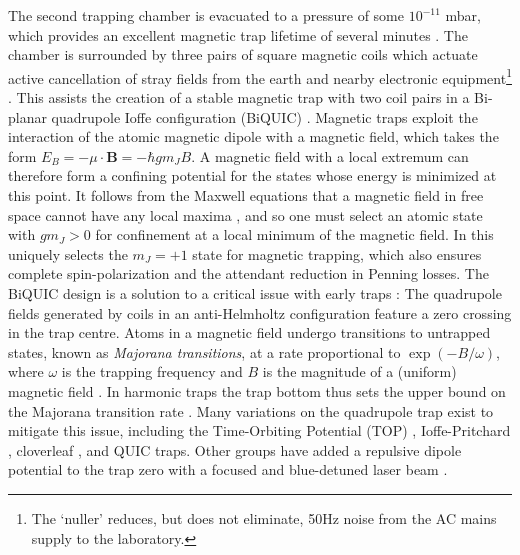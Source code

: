 	The second trapping chamber is evacuated to a pressure of some $10^{-11}$ mbar, which provides an excellent magnetic trap lifetime of several minutes . The chamber is surrounded by three pairs of square magnetic coils which actuate active cancellation of stray fields from the earth and nearby electronic equipment\footnote{The `nuller' reduces, but does not eliminate, 50Hz noise from the AC mains supply to the laboratory. } \cite{dedman07}. This assists the creation of a stable magnetic trap with two coil pairs in a Bi-planar quadrupole Ioffe configuration (BiQUIC) \cite{dall07}. Magnetic traps exploit the interaction of the atomic magnetic dipole with a magnetic field, which takes the form $E_B = -\mu\cdot \textbf{B} = -\hbar g m_J B$. A magnetic field with a local extremum can therefore form a confining potential for the states whose energy is minimized at this point. It follows from the Maxwell equations that a magnetic field in free space cannot have any local maxima \cite{MakingProbingUnderstanding}, and so one must select an atomic state with $g m_J>0$ for confinement at a local minimum of the magnetic field. In \mhe this uniquely selects the $m_J=+1$ state for magnetic trapping, which also ensures complete spin-polarization and the attendant reduction in Penning losses. The BiQUIC design is a solution to a critical issue with early traps \cite{migdall85}: The quadrupole fields generated by coils in an anti-Helmholtz configuration feature a zero crossing in the trap centre. Atoms in a magnetic field undergo transitions to untrapped states, known as \emph{Majorana transitions}, at a rate proportional to $\exp(-B/\omega)$, where $\omega$ is the trapping frequency and $B$ is the magnitude of a (uniform) magnetic field \cite{sukumar97}. In harmonic traps the trap bottom thus sets the upper bound on the Majorana transition rate \cite{brink06}. Many variations on the quadrupole trap exist to mitigate this issue, including the Time-Orbiting Potential (TOP) \cite{petrich95}, Ioffe-Pritchard \cite{pritchard83}, cloverleaf \cite{mewes97}, and QUIC \cite{esslinger98} traps. Other groups have added a repulsive dipole potential to the trap zero with a focused and blue-detuned laser beam \cite{papers}. 

